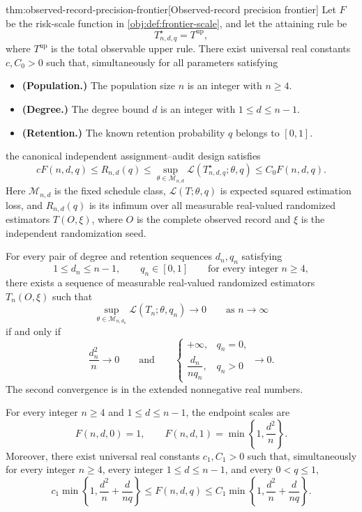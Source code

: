 \begin{theoremv}{thm:observed-record-precision-frontier}[Observed-record precision frontier]
Let \(F\) be the risk-scale function in \cref{obj:def:frontier-scale}, and let the attaining rule be
\[
T^\star_{n,d,q}=T^{\mathrm{up}},
\]
where \(T^{\mathrm{up}}\) is the total observable upper rule. There exist universal real constants \(c,C_0>0\) such that, simultaneously for all parameters satisfying
\begin{itemize}
\item \textbf{(Population.)} The population size \(n\) is an integer with \(n\ge4\).
\item \textbf{(Degree.)} The degree bound \(d\) is an integer with \(1\le d\le n-1\).
\item \textbf{(Retention.)} The known retention probability \(q\) belongs to \([0,1]\).
\end{itemize}
the canonical independent assignment--audit design satisfies
\[
cF(n,d,q)
\le R_{n,d}(q)
\le
\sup_{\theta\in\mathcal M_{n,d}}
\mathcal L(T^\star_{n,d,q};\theta,q)
\le C_0F(n,d,q).
\]
Here \(\mathcal M_{n,d}\) is the fixed schedule class, \(\mathcal L(T;\theta,q)\) is expected squared estimation loss, and \(R_{n,d}(q)\) is its infimum over all measurable real-valued randomized estimators \(T(O,\xi)\), where \(O\) is the complete observed record and \(\xi\) is the independent randomization seed.

For every pair of degree and retention sequences \(d_n,q_n\) satisfying
\[
1\le d_n\le n-1,\qquad q_n\in[0,1]
\qquad\text{for every integer }n\ge4,
\]
there exists a sequence of measurable real-valued randomized estimators \(T_n(O,\xi)\) such that
\[
\sup_{\theta\in\mathcal M_{n,d_n}}
\mathcal L(T_n;\theta,q_n)\longrightarrow0
\qquad\text{as }n\longrightarrow\infty
\]
if and only if
\[
\frac{d_n^2}{n}\longrightarrow0
\qquad\text{and}\qquad
\begin{cases}
+\infty,&q_n=0,\\[2pt]
\dfrac{d_n}{nq_n},&q_n>0
\end{cases}
\longrightarrow0.
\]
The second convergence is in the extended nonnegative real numbers.

For every integer \(n\ge4\) and \(1\le d\le n-1\), the endpoint scales are
\[
F(n,d,0)=1,
\qquad
F(n,d,1)=\min\left\{1,\frac{d^2}{n}\right\}.
\]
Moreover, there exist universal real constants \(c_1,C_1>0\) such that, simultaneously for every integer \(n\ge4\), every integer \(1\le d\le n-1\), and every \(0<q\le1\),
\[
c_1\min\left\{1,\frac{d^2}{n}+\frac{d}{nq}\right\}
\le F(n,d,q)
\le
C_1\min\left\{1,\frac{d^2}{n}+\frac{d}{nq}\right\}.
\]
\end{theoremv}

